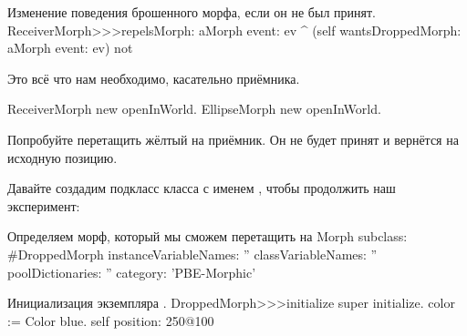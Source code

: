 \documentclass[a4paper,10pt,twoside]{book}
\begin{document}
\begin{method}{Изменение поведения брошенного морфа, если он не был принят.}
ReceiverMorph>>>repelsMorph: aMorph event: ev
	^ (self wantsDroppedMorph: aMorph event: ev) not
\end{method}

Это всё что нам необходимо, касательно приёмника.

\begin{code}{}
ReceiverMorph new openInWorld.
EllipseMorph new openInWorld.
\end{code}
\noindent
Попробуйте перетащить жёлтый  на приёмник. Он не будет принят и вернётся на исходную позицию.


Давайте создадим подкласс класса  с именем , чтобы продолжить наш эксперимент:

\begin{classdef}{Определяем морф, который мы сможем перетащить на }
Morph subclass: #DroppedMorph
	instanceVariableNames: ''
	classVariableNames: ''
	poolDictionaries: ''
	category: 'PBE-Morphic'
\end{classdef}

\begin{method}{Инициализация экземпляра .}
DroppedMorph>>>initialize
	super initialize.
	color := Color blue.
	self position: 250@100
\end{method}
\end{document}
